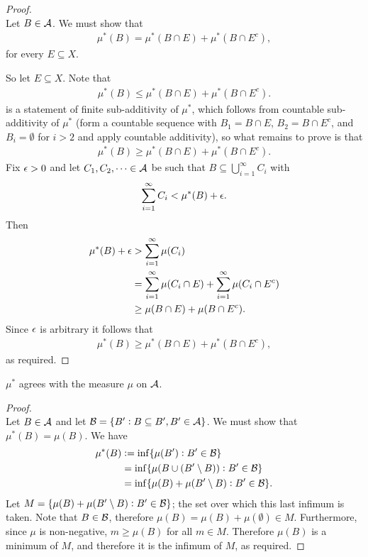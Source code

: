 \begin{proof}~\\
  Let $B \in \mathcal A$. We must show that
  \begin{align*}
    \mu^*(B) = \mu^*(B \cap E) + \mu^*(B \cap E^c),
  \end{align*}
  for every $E \subseteq X$.

  So let $E \subseteq X$. Note that
  \begin{align*}
    \mu^*(B) \leq \mu^*(B \cap E) + \mu^*(B \cap E^c).
  \end{align*}
  is a statement of finite sub-additivity of $\mu^*$, which follows from countable sub-additivity of $\mu^*$
  (form a countable sequence with $B_1 = B \cap E$, $B_2 = B \cap E^c$, and $B_i = \emptyset$ for $i > 2$ and
  apply countable additivity), so what remains to prove is that
  \begin{align*}
    \mu^*(B) \geq \mu^*(B \cap E) + \mu^*(B \cap E^c).
  \end{align*}
  Fix $\epsilon > 0$ and let $C_{1}, C_{2}, \dots \in \mathcal A$ be such that $B \subseteq \bigcup_{i=1}^\infty C_{i}$ with
  \begin{align*}
    \sum_{i=1}^\infty C_i < \mu^*(B) + \epsilon.
  \end{align*}
  Then
  \begin{align*}
    \mu^*(B) + \epsilon
    &> \sum_{i=1}^\infty \mu(C_i) \\
    &= \sum_{i=1}^\infty \mu(C_i \cap E) + \sum_{i=1}^\infty \mu(C_i \cap E^c) \\
    &\geq \mu(B \cap E) + \mu(B \cap E^c).
  \end{align*}
  Since $\epsilon$ is arbitrary it follows that
  \begin{align*}
    \mu^*(B) \geq \mu^*(B \cap E) + \mu^*(B \cap E^c),
  \end{align*}
  as required.
\end{proof}

\begin{claim*}
  $\mu^*$ agrees with the measure $\mu$ on $\mathcal A$.
\end{claim*}

\begin{proof}~\\
  Let $B \in \mathcal A$ and let $\mathcal B = \{B' : B \subseteq B', B' \in \mathcal A\}$. We must show
  that $\mu^*(B) = \mu(B)$. We have
  \begin{align*}
    \mu^*(B)
    &:= \inf \{\mu(B') : B' \in \mathcal B\} \\
    &=  \inf \{\mu(B \cup (B' \setminus B)) : B' \in \mathcal B\} \\
    &=  \inf \{\mu(B) + \mu(B' \setminus B) : B' \in \mathcal B\}.
  \end{align*}
  Let $M = \{\mu(B) + \mu(B' \setminus B) : B' \in \mathcal B\}$; the set over which this last infimum is taken.
  Note that $B \in \mathcal B$, therefore $\mu(B) = \mu(B) + \mu(\emptyset) \in M$. Furthermore, since $\mu$ is
  non-negative, $m \geq \mu(B)$ for all $m \in M$. Therefore $\mu(B)$ is a minimum of $M$, and therefore it is
  the infimum of $M$, as required.
\end{proof}

